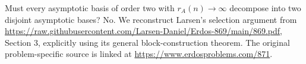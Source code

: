 Must every asymptotic basis of order two with $r_A(n)\to\infty$ decompose into two disjoint asymptotic bases? No. We reconstruct Larsen's selection argument from \url{https://raw.githubusercontent.com/Larsen-Daniel/Erdos-869/main/869.pdf}, Section 3, explicitly using its general block-construction theorem. The original problem-specific source is linked at \url{https://www.erdosproblems.com/871}.
